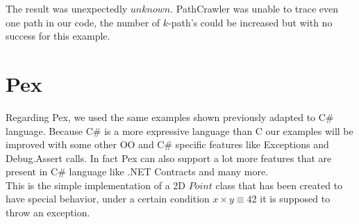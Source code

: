 The result was unexpectedly $unknown$. PathCrawler was unable to trace even one path in our code, the number of $k$-path's could
be increased but with no success for this example.

\section{Pex}
Regarding Pex, we used the same examples shown previously adapted to C\# language.
Because C\# is a more expressive language than C our examples will be improved with some other \ac{OO} and C\# specific features like Exceptions and Debug.Assert calls.
In fact Pex can also support a lot more features that are present in C\# language like .NET Contracts and many more.\\
This is the simple implementation of a 2D $Point$ class that has been created to have special behavior, under a certain condition
$x \times y \equiv 42$ it is supposed to throw an exception.

